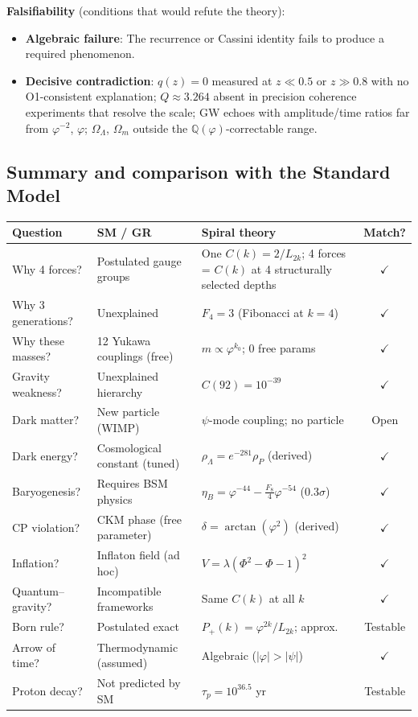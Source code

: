 \documentclass[12pt,a4paper]{article}
\begin{document}
\medskip
\textbf{Falsifiability} (conditions that would refute the theory):

\begin{itemize}[nosep,leftmargin=*]
\item \textbf{Algebraic failure}: The recurrence or Cassini identity fails to produce a required phenomenon.
\item \textbf{Decisive contradiction}: $q(z){=}0$ measured at $z \ll 0.5$ or $z \gg 0.8$ with no O1-consistent explanation; $Q \approx 3.264$ absent in precision coherence experiments that resolve the scale; GW echoes with amplitude/time ratios far from $\varphi^{-2}$, $\varphi$; $\Omega_\Lambda$, $\Omega_m$ outside the $\mathbb{Q}(\varphi)$-correctable range.
\end{itemize}

\subsection{Summary and comparison with the Standard Model}

\begin{center}
\small
\begin{tabular}{|p{2.7cm}|p{4.2cm}|p{4.2cm}|c|}
\hline
\textbf{Question} & \textbf{SM / GR} & \textbf{Spiral theory} & \textbf{Match?} \\
\hline\hline
Why 4 forces? & Postulated gauge groups & One $C(k)=2/L_{2k}$; 4 forces = $C(k)$ at 4 structurally selected depths & $\checkmark$ \\
Why 3 generations? & Unexplained & $F_4 = 3$ (Fibonacci at $k{=}4$) & $\checkmark$ \\
Why these masses? & 12 Yukawa couplings (free) & $m \propto \varphi^{k_0}$; 0 free params & $\checkmark$ \\
Gravity weakness? & Unexplained hierarchy & $C(92) = 10^{-39}$ & $\checkmark$ \\
Dark matter? & New particle (WIMP) & $\psi$-mode coupling; no particle & Open \\
Dark energy? & Cosmological constant (tuned) & $\rho_\Lambda = e^{-281}\rho_P$ (derived) & $\checkmark$ \\
Baryogenesis? & Requires BSM physics & $\eta_B = \varphi^{-44}{-}\tfrac{F_8}{4}\varphi^{-54}$ ($0.3\sigma$) & $\checkmark$ \\
CP violation? & CKM phase (free parameter) & $\delta = \arctan(\varphi^2)$ (derived) & $\checkmark$ \\
Inflation? & Inflaton field (ad hoc) & $V = \lambda(\Phi^2{-}\Phi{-}1)^2$ & $\checkmark$ \\
Quantum--gravity? & Incompatible frameworks & Same $C(k)$ at all $k$ & $\checkmark$ \\
Born rule? & Postulated exact & $P_+(k) = \varphi^{2k}/L_{2k}$; approx. & Testable \\
Arrow of time? & Thermodynamic (assumed) & Algebraic ($|\varphi| > |\psi|$) & $\checkmark$ \\
Proton decay? & Not predicted by SM & $\tau_p = 10^{36.5}$ yr & Testable \\
\hline
\end{tabular}
\end{center}
\end{document}
